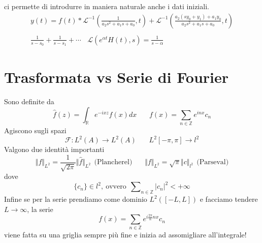 ci permette di introdurre in maniera naturale anche i dati iniziali.
\begin{gather*}
y( t) =f( t) *\mathcal{L}^{-1}\left(\frac{1}{a_{2} s^{2} +a_{1} s+a_{0}} ,t\right) +\mathcal{L}^{-1}\left(\frac{a_{2}( sy_{0} +y_{1}) +a_{1} y_{0}}{a_{2} s^{2} +a_{1} s+a_{0}} ,t\right)\\
\\
\frac{1}{s-s_{0}} +\frac{1}{s-s_{1}} +\cdots \ \ \ \ \mathcal{L}\left( e^{\alpha t} H( t) ,s\right) =\frac{1}{s-\alpha }
\end{gather*}
\section{Trasformata vs Serie di Fourier}

Sono definite da
\begin{equation*}
\hat{f}( z) =\int _{\mathbb{R}} e^{-ixz} f( x) dx\ \ \ \ \ \ \ \ f( x) =\sum _{n\in \mathbb{Z}} e^{inx} c_{n}
\end{equation*}
Agiscono sugli spazi
\begin{equation*}
\mathcal{F} :L^{2}( A)\rightarrow L^{2}( A) \ \ \ \ \ \ \ \ L^{2}[ -\pi ,\pi ]\rightarrow l^{2}
\end{equation*}
Valgono due identità importanti
\begin{equation*}
\Vert f\Vert _{L^{2}} =\frac{1}{\sqrt{2\pi }}\Vert \hat{f}\Vert _{L^{2}} \ \ \text{(Plancherel)} \ \ \ \ \ \ \ \ \Vert f\Vert _{L^{2}} =\sqrt{\pi }\Vert c\Vert _{l^{2}} \ \ \text{(Parseval)}
\end{equation*}
dove
\begin{equation*}
\{c_{n}\} \in l^{2} ,\ \text{ovvero} \ \ \sum\nolimits _{n\in \mathbb{Z}}| c_{n}| ^{2} < +\infty 
\end{equation*}
Infine se per la serie prendiamo come dominio $L^{2}([ -L,L])$ e facciamo tendere $L\rightarrow \infty $, la serie
\begin{equation*}
f( x) =\sum _{n\in \mathbb{Z}} e^{i\frac{2\pi }{L} nx} c_{n}
\end{equation*}
viene fatta su una griglia sempre più fine e inizia ad assomigliare all'integrale!

